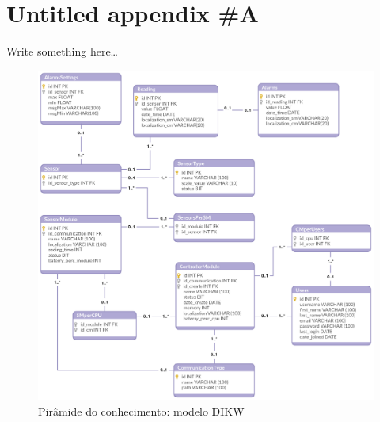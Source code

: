 \chapter{Untitled appendix \#A}
Write something here\ldots


\begin{figure}[!htb]
	\centering
	\includegraphics[scale=0.25]{esquemas/database_tese.pdf}
	\caption{Pirâmide do conhecimento: modelo DIKW}
	\label{db}
\end{figure}

